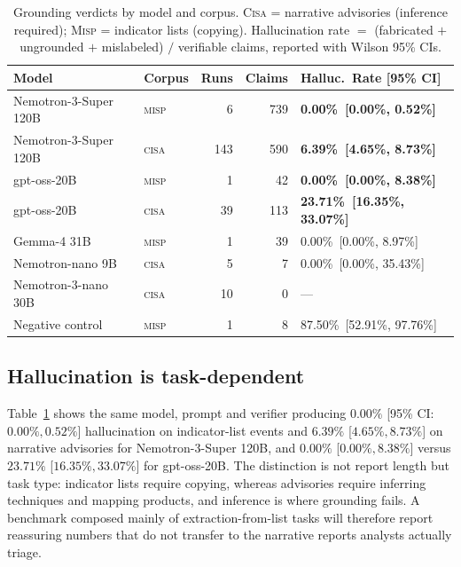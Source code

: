 \documentclass[10pt,twocolumn]{article}
\begin{document}
\begin{table}[t]
\centering\footnotesize
\caption{Grounding verdicts by model and corpus. \textsc{Cisa} = narrative
advisories (inference required); \textsc{Misp} = indicator lists (copying).
Hallucination rate $=$ (fabricated $+$ ungrounded $+$ mislabeled) $/$
verifiable claims, reported with Wilson 95\% CIs.}
\label{tab:main}
\setlength{\tabcolsep}{3.5pt}
\begin{tabular}{@{}llrrl@{}}
\toprule
Model & Corpus & Runs & Claims & Halluc.\ Rate [95\% CI] \\
\midrule
Nemotron-3-Super 120B & \textsc{misp} & 6   & 739 & \bf 0.00\%\ [0.00\%, 0.52\%] \\
Nemotron-3-Super 120B & \textsc{cisa} & 143 & 590 & \bf 6.39\%\ [4.65\%, 8.73\%] \\
gpt-oss-20B           & \textsc{misp} & 1   & 42  & \bf 0.00\%\ [0.00\%, 8.38\%] \\
gpt-oss-20B           & \textsc{cisa} & 39  & 113 & \bf 23.71\%\ [16.35\%, 33.07\%] \\
Gemma-4 31B           & \textsc{misp} & 1   & 39  & 0.00\%\ [0.00\%, 8.97\%] \\
Nemotron-nano 9B      & \textsc{cisa} & 5   & 7   & 0.00\%\ [0.00\%, 35.43\%] \\
Nemotron-3-nano 30B   & \textsc{cisa} & 10  & 0   & --- \\
\midrule
Negative control      & \textsc{misp} & 1   & 8   & 87.50\%\ [52.91\%, 97.76\%] \\
\bottomrule
\end{tabular}
\end{table}

\subsection{Hallucination is task-dependent}
Table~\ref{tab:main} shows the same model, prompt and verifier producing
$0.00\%$ [95\% CI: $0.00\%, 0.52\%$] hallucination on indicator-list events and $6.39\%$ [$4.65\%, 8.73\%$] on narrative
advisories for Nemotron-3-Super 120B, and $0.00\%$ [$0.00\%, 8.38\%$] versus $23.71\%$ [$16.35\%, 33.07\%$] for gpt-oss-20B. The
distinction is not report length but task type: indicator lists require
copying, whereas advisories require inferring techniques and mapping products,
and inference is where grounding fails. A benchmark composed mainly of
extraction-from-list tasks will therefore report reassuring numbers that do not
transfer to the narrative reports analysts actually triage.
\end{document}
